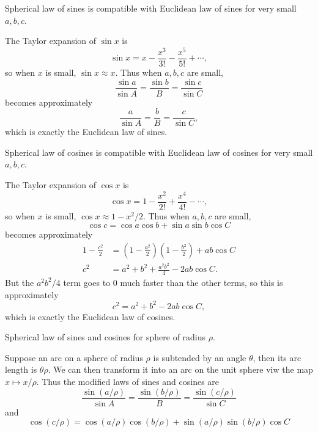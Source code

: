\documentclass[twoside,10pt]{article}
\begin{document}

\begin{exer}[10.15]
Spherical law of sines is compatible with Euclidean law of sines for very small $a,b,c$.
\end{exer}

The Taylor expansion of $\sin x$ is
\[
\sin x = x - \frac{x^{3}}{3!} - \frac{x^{5}}{5!} + \cdots,
\] so when $x$ is small, $\sin x \approx x$. Thus when $a,b,c$ are small,
\[
\frac{\sin a}{\sin A} = \frac{\sin b}{B} = \frac{\sin c}{\sin C} 
\] becomes approximately
\[
\frac{a}{\sin A} = \frac{b}{B} = \frac{c}{\sin C},
\] which is exactly the Euclidean law of sines.

\newpage

\begin{exer}[10.16]
Spherical law of cosines is compatible with Euclidean law of cosines for very small $a,b,c$.
\end{exer}

The Taylor expansion of $\cos x$ is
\[
\cos x = 1 - \frac{x^{2}}{2!} + \frac{x^{4}}{4!} - \cdots,
\] so when $x$ is small, $\cos x \approx 1 - x^2/2$. Thus when $a,b,c$ are small,
\[
	\cos c = \cos a \cos b + \sin a \sin b \cos C
\] becomes approximately
\begin{align*}
	1 - \frac{c^2}{2} &= \left( 1-\frac{a^{2}}{2}  \right)\left( 1-\frac{b^{2}}{2}  \right)+ab\cos C \\
	c^{2} &= a^{2}+b^2 + \frac{a^{2}b^{2}}{4} -2ab\cos C.
\end{align*}
But the $a^{2}b^2/4$ term goes to 0 much faster than the other terms, so this is approximately
\[
c^{2} = a^{2}+b^2-2ab\cos C,
\] 
which is exactly the Euclidean law of cosines.

\newpage

\begin{exer}[10.17]
Spherical law of sines and cosines for sphere of radius $\rho$.
\end{exer}

Suppose an arc on a sphere of radius $\rho$ is subtended by an angle $\theta$, then its arc length is $\theta \rho$. We can then transform it into an arc on the unit sphere viw the map $x \mapsto x/\rho$. Thus the modified laws of sines and cosines are
\[
	\frac{\sin (a/\rho)}{\sin A} = \frac{\sin (b/\rho)}{B} = \frac{\sin (c/\rho)}{\sin C}
\] and
\[
	\cos (c/\rho) = \cos (a/\rho) \cos (b/\rho) + \sin (a/\rho) \sin (b/\rho) \cos C
\] 
\end{document}
